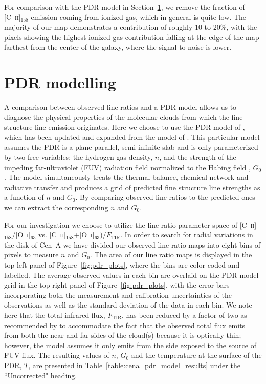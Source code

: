 \documentclass[preprint2]{aastex}
\begin{document}
For comparison with the PDR model in Section~\ref{pdr_model}, we remove the fraction of [C~\textsc{ii}]$_{158}$ emission coming from ionized gas, which in general is quite low.  The majority of our map demonstrates a contribution of roughly 10 to 20\%, with the pixels showing the highest ionized gas contribution falling at the edge of the map farthest from the center of the galaxy, where the signal-to-noise is lower.


\section{PDR modelling}\label{pdr_model}

A comparison between observed line ratios and a PDR model allows us to diagnose the physical properties of the molecular clouds from which the fine structure line emission originates.  Here we choose to use the PDR model of \citet{1999ApJ...527..795K,2006ApJ...644..283K}, which has been updated and expanded from the model of \citet{1985ApJ...291..722T}.  This particular model assumes the PDR is a plane-parallel, semi-infinite slab and is only parameterized by two free variables: the hydrogen gas density, $n$, and the strength of the impeding far-ultraviolet (FUV) radiation field normalized to the Habing field \citep[$1.6 \times 10^{-3}$~erg~cm$^{-2}$~s$^{-1}$; ][]{1968BAN....19..421H}, $G_{0}$.  The model simultaneously treats the thermal balance, chemical network and radiative transfer and produces a grid of predicted fine structure line strengths as a function of $n$ and $G_{0}$.  By comparing observed line ratios to the predicted ones we can extract the corresponding $n$ and $G_{0}$.

For our investigation we choose to utilize the line ratio parameter space of [C~\textsc{ii}]$_{158}$/[O~\textsc{i}]$_{63}$ vs. [C~\textsc{ii}]$_{158}$+[O~\textsc{i}]$_{63}$)/$F_{\mathrm{TIR}}$.  In order to search for radial variations in the disk of Cen~A we have divided our observed line ratio maps into eight bins of pixels to measure $n$ and $G_{0}$.  The area of our line ratio maps is displayed in the top left panel of Figure~\ref{fig:pdr_plots}, where the bins are color-coded and labelled.  The average observed values in each bin are overlaid on the PDR model grid in the top right panel of Figure~\ref{fig:pdr_plots}, with the error bars incorporating both the measurement and calibration uncertainties of the observations as well as the standard deviation of the data in each bin.  We note here that the total infrared flux, $F_{\mathrm{TIR}}$, has been reduced by a factor of two as recommended by \citet{1999ApJ...527..795K} to accommodate the fact that the observed total flux emits from both the near and far sides of the cloud(s) because it is optically thin; however, the model assumes it only emits from the side exposed to the source of FUV flux.  The resulting values of $n$, $G_{0}$ and the temperature at the surface of the PDR, $T$, are presented in Table~\ref{table:cena_pdr_model_results} under the ``Uncorrected" heading.
\end{document}
